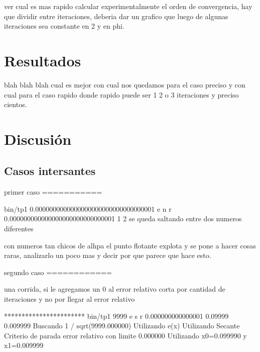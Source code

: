 \documentclass[10pt,a4paper]{article}
\begin{document}
ver cual es mas rapido
calcular experimentalmente el orden de convergencia, hay que dividir entre
iteraciones, deberia dar un grafico que luego de algunas iteraciones sea
constante en 2 y en phi.

\section{Resultados}

blah blah blah cual es mejor con cual nos quedamos para el caso preciso y con
cual para el caso rapido donde rapido puede ser 1 2 o 3 iteraciones y preciso
cientos.
\section{Discusión}

\subsection{Casos intersantes}

primer caso
===========

bin/tp1 0.0000000000000000000000000000000001 e n r 0.000000000000000000000000000001 1 2
se queda saltando entre dos numeros diferentes

con numeros tan chicos de alhpa el punto flotante explota y se pone a hacer cosas raras, analizarlo un poco mas y decir por que parece que hace esto.


segundo caso
============

una corrida, si le agregamos un 0 al error relativo corta por cantidad de iteraciones y no por llegar al error relativo

*********************** bin/tp1 9999 e s r 0.000000000000001 0.09999 0.009999
Buscando 1 / sqrt(9999.000000)
Utilizando e(x)
Utilizando Secante
Criterio de parada error relativo con limite 0.000000
Utilizando x0=0.099990 y x1=0.009999
\end{document}
